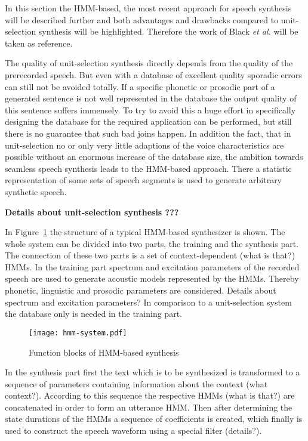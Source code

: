 In this section the \ac{HMM}-based, the most recent approach for speech synthesis will be described further and both advantages and drawbacks compared to unit-selection synthesis will be highlighted. Therefore the work of Black \textit{et al.} \cite{black:statistical} will be taken as reference.

The quality of unit-selection synthesis directly depends from the quality of the prerecorded speech. But even with a database of excellent quality sporadic errors can still not be avoided totally. If a specific phonetic or prosodic part of a generated sentence is not well represented in the database the output quality of this sentence suffers immensely. To try to avoid this a huge effort in specifically designing the database for the required application can be performed, but still there is no guarantee that such bad joins happen. In addition the fact, that in unit-selection no or only very little adaptions of the voice characteristics are possible without an enormous increase of the database size, the ambition towards seamless speech synthesis leads to the \ac{HMM}-based approach. There a statistic representation of some sets of speech segments is used to generate arbitrary synthetic speech.

\textbf{{\color{ACMRed}Details about unit-selection synthesis ???}}

In Figure~\ref{fig:hmm} the structure of a typical \ac{HMM}-based synthesizer is shown. The whole system can be divided into two parts, the training and the synthesis part. The connection of these two parts is a set of context-dependent ({\color{ACMRed}what is that?}) \acp{HMM}. In the training part spectrum and excitation parameters of the recorded speech are used to generate acoustic models represented by the \acp{HMM}. Thereby phonetic, linguistic and prosodic parameters are considered. {\color{ACMRed}Details about spectrum and excitation parameters?} In comparison to a unit-selection system the database only is needed in the training part.

\begin{figure}[h]
	\texttt{[image: hmm-system.pdf]}
	\caption{Function blocks of \ac{HMM}-based synthesis \cite{black:statistical}}
	\label{fig:hmm}
\end{figure}

In the synthesis part first the text which is to be synthesized is transformed to a sequence of parameters containing information about the context ({\color{ACMRed}what context?}). According to this sequence the respective \acp{HMM} ({\color{ACMRed}what is that?}) are concatenated in order to form an utterance \ac{HMM}. Then after determining the state durations of the \acp{HMM} a sequence of coefficients is created, which finally is used to construct the speech waveform using a special filter ({\color{ACMRed}details?}).

